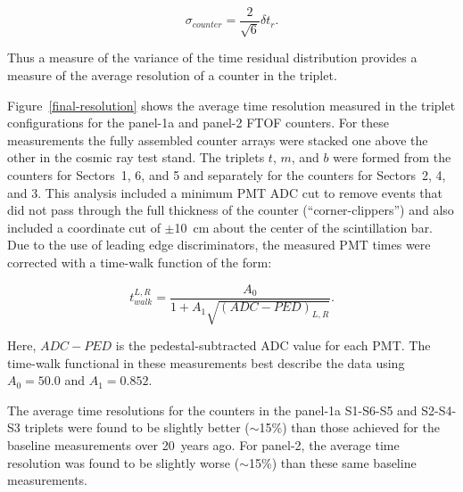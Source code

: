 \documentclass{elsart}
\begin{document}
\begin{equation}
\label{sig-counter}
\sigma_{counter} = \frac{2}{\sqrt{6}} \delta t_r.
\end{equation}

\noindent
Thus a measure of the variance of the time residual distribution provides a measure of the average
resolution of a counter in the triplet. 

Figure~\ref{final-resolution} shows the average time resolution measured in the triplet configurations
for the panel-1a and panel-2 FTOF counters. For these measurements the fully assembled counter arrays
were stacked one above the other in the cosmic ray test stand. The triplets $t$, $m$, and $b$ were
formed from the counters for Sectors~1, 6, and 5 and separately for the counters for Sectors~2, 4, and
3. This analysis included a minimum PMT ADC cut to remove events that did not pass through the full
thickness of the counter (``corner-clippers'') and also included a coordinate cut of $\pm$10~cm about
the center of the scintillation bar. Due to the use of leading edge discriminators, the measured PMT times
were corrected with a time-walk function of the form:

\begin{equation}
\label{walk-function}
t_{walk}^{L,R} = \frac{A_0}{1 + A_1 \sqrt{(ADC - PED)_{L,R}}}.
\end{equation}

\noindent
Here, $ADC - PED$ is the pedestal-subtracted ADC value for each PMT. The time-walk functional in
these measurements best describe the data using $A_0 = 50.0$ and $A_1 = 0.852$.

The average time resolutions for the counters in the panel-1a S1-S6-S5 and S2-S4-S3 triplets were
found to be slightly better ($\sim$15\%) than those achieved for the baseline measurements over
20~years ago. For panel-2, the average time resolution was found to be slightly worse ($\sim$15\%)
than these same baseline measurements.
\end{document}
